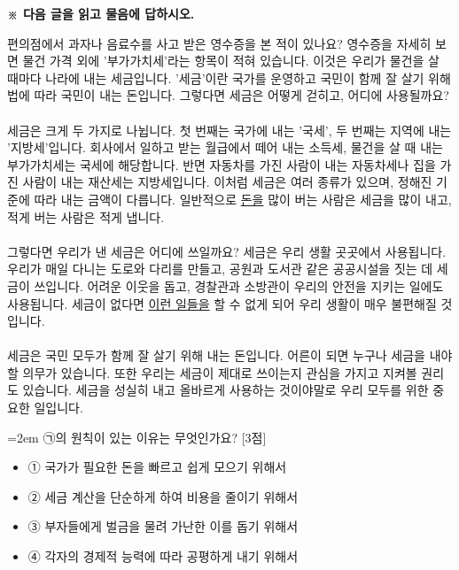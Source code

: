 \documentclass[12pt,a4paper]{article}
\newcommand{\qnum}[1]{%
  \tikz[baseline=(num.base)]{%
    \node[circle, fill=numCircle, text=white, inner sep=0pt,
          minimum size=18pt, font=\small\bfseries] (num) {#1};%
  }%
}
\newcommand{\pts}[1]{%
  \hfill\textcolor{ptsBadge}{[#1점]}%
}
\begin{document}
\vspace{4mm}
{\small\textbf{※ 다음 글을 읽고 물음에 답하시오.}}
\vspace{2mm}
\begin{tcolorbox}[passage]
편의점에서 과자나 음료수를 사고 받은 영수증을 본 적이 있나요? 영수증을 자세히 보면 물건 가격 외에 '부가가치세'라는 항목이 적혀 있습니다. 이것은 우리가 물건을 살 때마다 나라에 내는 세금입니다. '세금'이란 국가를 운영하고 국민이 함께 잘 살기 위해 법에 따라 국민이 내는 돈입니다. 그렇다면 세금은 어떻게 걷히고, 어디에 사용될까요? \\{}
\vspace{4pt} \\{}
세금은 크게 두 가지로 나뉩니다. 첫 번째는 국가에 내는 '국세', 두 번째는 지역에 내는 '지방세'입니다. 회사에서 일하고 받는 월급에서 떼어 내는 소득세, 물건을 살 때 내는 부가가치세는 국세에 해당합니다. 반면 자동차를 가진 사람이 내는 자동차세나 집을 가진 사람이 내는 재산세는 지방세입니다. 이처럼 세금은 여러 종류가 있으며, 정해진 기준에 따라 내는 금액이 다릅니다. 일반적으로 \uline{돈을} 많이 버는 사람은 세금을 많이 내고, 적게 버는 사람은 적게 냅니다. \\{}
\vspace{4pt} \\{}
그렇다면 우리가 낸 세금은 어디에 쓰일까요? 세금은 우리 생활 곳곳에서 사용됩니다. 우리가 매일 다니는 도로와 다리를 만들고, 공원과 도서관 같은 공공시설을 짓는 데 세금이 쓰입니다. 어려운 이웃을 돕고, 경찰관과 소방관이 우리의 안전을 지키는 일에도 사용됩니다. 세금이 없다면 \uline{이런 일들을} 할 수 없게 되어 우리 생활이 매우 불편해질 것입니다. \\{}
\vspace{4pt} \\{}
세금은 국민 모두가 함께 잘 살기 위해 내는 돈입니다. 어른이 되면 누구나 세금을 내야 할 의무가 있습니다. 또한 우리는 세금이 제대로 쓰이는지 관심을 가지고 지켜볼 권리도 있습니다. 세금을 성실히 내고 올바르게 사용하는 것이야말로 우리 모두를 위한 중요한 일입니다.
\end{tcolorbox}
\vspace{3mm}
\begin{minipage}{\columnwidth}
{\hangindent=2em
\qnum{11}\enspace ㉠의 원칙이 있는 이유는 무엇인가요? \pts{3}
\par}

\vspace{3mm}
\begin{itemize}[leftmargin=2.5em, labelsep=0.3em, label={}, itemsep=4pt, parsep=1pt, topsep=0pt]
  \item ① 국가가 필요한 돈을 빠르고 쉽게 모으기 위해서
  \item ② 세금 계산을 단순하게 하여 비용을 줄이기 위해서
  \item ③ 부자들에게 벌금을 물려 가난한 이를 돕기 위해서
  \item ④ 각자의 경제적 능력에 따라 공평하게 내기 위해서
\end{itemize}
\end{minipage}
\vspace{4mm}
\end{document}
